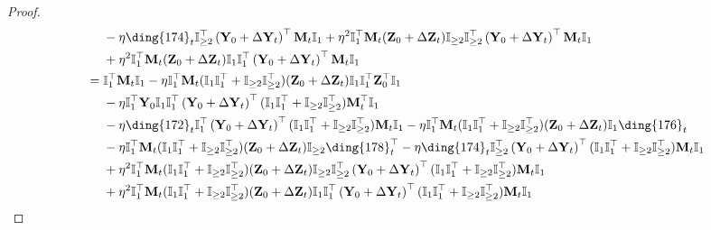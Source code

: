 \documentclass{article}
\theoremstyle{plain}
\theoremstyle{remark}
\def\bY{\mathbf{Y}}
\def\bZ{\mathbf{Z}}
\newcommand{\cc}[1]{\text{\ding{\number\numexpr#1 + 171\relax}}}
\begin{document}
\begin{proof}
\begin{align*}
        &~~~~ 
            -\eta \cc{3}_t \mathbb{I}_{\ge2}^\top\left(\bY_0+\Delta\bY_t\right)^\top \mathbf{M}_{t}\mathbb{I}_{1} 
            + \eta^2 \mathbb{I}_{1}^\top\mathbf{M}_{t}(\bZ_0+\Delta\bZ_t)\mathbb{I}_{\ge2}\mathbb{I}_{\ge2}^\top\left(\bY_0+\Delta\bY_t\right)^\top \mathbf{M}_{t}\mathbb{I}_{1}
        \\
        &~~~~
            + \eta^2\mathbb{I}_{1}^\top\mathbf{M}_{t}(\bZ_0+\Delta\bZ_t)\mathbb{I}_1\mathbb{I}_{1}^\top\left(\bY_0+\Delta\bY_t\right)^\top\mathbf{M}_{t}\mathbb{I}_{1} 
        \\
        &=
            \mathbb{I}_{1}^\top\mathbf{M}_{t} \mathbb{I}_{1}
            - \eta\mathbb{I}_{1}^\top \mathbf{M}_{t}(\mathbb{I}_{1}\mathbb{I}_{1}^\top+\mathbb{I}_{\ge 2}\mathbb{I}_{\ge 2}^\top) (\bZ_0+\Delta\bZ_t)\mathbb{I}_{1}\mathbb{I}_{1}^\top \bZ_0^\top\mathbb{I}_{1} 
            \\
            &~~~~ - \eta \mathbb{I}_{1}^\top \bY_0 \mathbb{I}_{1}\mathbb{I}_{1}^\top \left(\bY_0+\Delta\bY_t\right)^\top (\mathbb{I}_{1}\mathbb{I}_{1}^\top+\mathbb{I}_{\ge 2}\mathbb{I}_{\ge 2}^\top)\mathbf{M}_{t}^\top \mathbb{I}_{1}  
        \\
        &~~~~ 
            -\eta \cc{1}_t \mathbb{I}_{1}^\top\left(\bY_0+\Delta\bY_t\right)^\top(\mathbb{I}_{1}\mathbb{I}_{1}^\top+\mathbb{I}_{\ge 2}\mathbb{I}_{\ge 2}^\top)\mathbf{M}_{t}\mathbb{I}_{1} 
            - \eta \mathbb{I}_{1}^\top\mathbf{M}_{t}(\mathbb{I}_{1}\mathbb{I}_{1}^\top+\mathbb{I}_{\ge 2}\mathbb{I}_{\ge 2}^\top)(\bZ_0+\Delta\bZ_t)\mathbb{I}_1\cc{5}_t 
        \\
        &~~~~ 
            - \eta\mathbb{I}_{1}^\top\mathbf{M}_{t}(\mathbb{I}_{1}\mathbb{I}_{1}^\top+\mathbb{I}_{\ge 2}\mathbb{I}_{\ge 2}^\top)(\bZ_0+\Delta\bZ_t)\mathbb{I}_{\ge 2}\cc{7}_t^\top 
            -\eta \cc{3}_t \mathbb{I}_{\ge2}^\top\left(\bY_0+\Delta\bY_t\right)^\top (\mathbb{I}_{1}\mathbb{I}_{1}^\top+\mathbb{I}_{\ge 2}\mathbb{I}_{\ge 2}^\top)\mathbf{M}_{t}\mathbb{I}_{1} 
        \\
        &~~~~
            + \eta^2 \mathbb{I}_{1}^\top\mathbf{M}_{t}(\mathbb{I}_{1}\mathbb{I}_{1}^\top+\mathbb{I}_{\ge 2}\mathbb{I}_{\ge 2}^\top)(\bZ_0+\Delta\bZ_t)\mathbb{I}_{\ge2}\mathbb{I}_{\ge2}^\top\left(\bY_0+\Delta\bY_t\right)^\top (\mathbb{I}_{1}\mathbb{I}_{1}^\top+\mathbb{I}_{\ge 2}\mathbb{I}_{\ge 2}^\top)\mathbf{M}_{t}\mathbb{I}_{1}
        \\
        &~~~~ 
            + \eta^2 \mathbb{I}_{1}^\top\mathbf{M}_{t}(\mathbb{I}_{1}\mathbb{I}_{1}^\top+\mathbb{I}_{\ge 2}\mathbb{I}_{\ge 2}^\top)(\bZ_0+\Delta\bZ_t)\mathbb{I}_{1}\mathbb{I}_{1}^\top\left(\bY_0+\Delta\bY_t\right)^\top (\mathbb{I}_{1}\mathbb{I}_{1}^\top+\mathbb{I}_{\ge 2}\mathbb{I}_{\ge 2}^\top)\mathbf{M}_{t}\mathbb{I}_{1}

\end{align*}
\end{proof}
\end{document}
